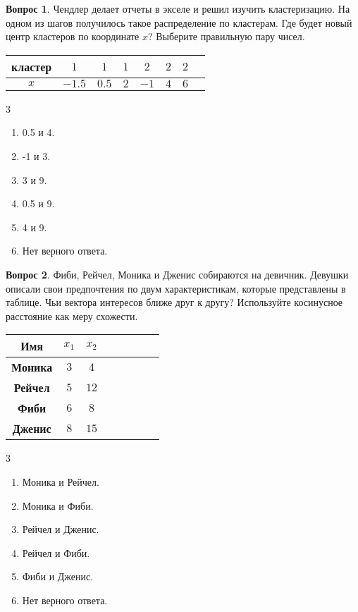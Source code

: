 \documentclass[12pt]{article}
\newenvironment{answerlist}[1][3]{
\begin{multicols}{#1}

\begin{enumerate}[label=\fbox{\emph{\Alph*}},ref=\emph{\alph*}]
}
{
\item Нет верного ответа.
\end{enumerate}
\end{multicols}
}
\theoremstyle{definition}
\newtheorem{question}{Вопрос}
\begin{document}
\begin{question}
Чендлер делает отчеты в экселе и решил изучить кластеризацию. На одном из шагов получилось такое распределение по кластерам. Где будет новый центр кластеров по координате $x$? Выберите правильную пару чисел.
\begin{table}[h]
    \centering
    \begin{tabular}{>{\bfseries}cccccccc}
        \toprule
         кластер & $1$ & $1$ & $1$ & $2$ & $2$ & $2$ \\ \midrule
         $x$ & $-1.5$ & $0.5$ & $2$ & $-1$ & $4$ & $6$\\
         \bottomrule
    \end{tabular}
\end{table}
\begin{answerlist}
  \item 0.5 и 4.
  \item -1 и 3.
  \item 3 и 9.
  \item 0.5 и 9.
  \item 4 и 9.
\end{answerlist}
\end{question}

\newpage

\begin{question}
Фиби, Рейчел, Моника и Дженис собираются на девичник. Девушки описали свои предпочтения по двум характеристикам, которые представлены в таблице. Чьи вектора интересов ближе друг к другу? Используйте косинусное расстояние как меру схожести.

\begin{table}[h]
    \centering
    \begin{tabular}{>{\bfseries}cccccccc}
        \toprule
        Имя & $x_1$ & $x_2$ \\ \midrule
         Моника & $3$ & $4$ \\ 
         Рейчел & $5$ & $12$ \\
         Фиби & $6$ & $8$ \\
         Дженис & $8$ & $15$
    \end{tabular}
\end{table}
\begin{answerlist}
  \item Моника и Рейчел.
  \item Моника и Фиби.
  \item Рейчел и Дженис.
  \item Рейчел и Фиби.
  \item Фиби и Дженис.
\end{answerlist}
\end{question}
\end{document}
